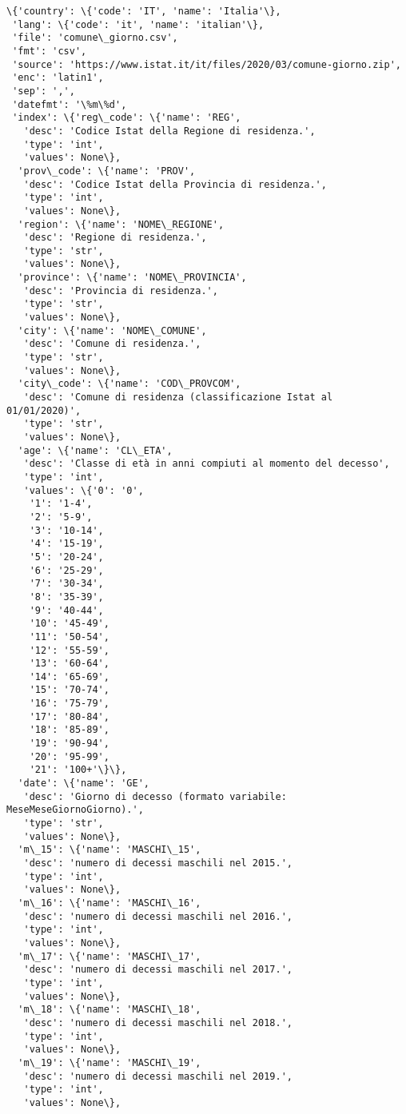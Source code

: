 \documentclass[11pt]{article}
\makeatletter
\newcommand{\boxspacing}{\kern\kvtcb@left@rule\kern\kvtcb@boxsep}
\newcommand{\prompt}[4]{
        \ttfamily\llap{{\color{#2}[#3]:\hspace{3pt}#4}}\vspace{-\baselineskip}
    }
\makeatother
\begin{document}
            \begin{tcolorbox}[breakable, size=fbox, boxrule=.5pt, pad at break*=1mm, opacityfill=0]
\prompt{Out}{outcolor}{9}{\boxspacing}
\begin{Verbatim}[commandchars=\\\{\}]
\{'country': \{'code': 'IT', 'name': 'Italia'\},
 'lang': \{'code': 'it', 'name': 'italian'\},
 'file': 'comune\_giorno.csv',
 'fmt': 'csv',
 'source': 'https://www.istat.it/it/files/2020/03/comune-giorno.zip',
 'enc': 'latin1',
 'sep': ',',
 'datefmt': '\%m\%d',
 'index': \{'reg\_code': \{'name': 'REG',
   'desc': 'Codice Istat della Regione di residenza.',
   'type': 'int',
   'values': None\},
  'prov\_code': \{'name': 'PROV',
   'desc': 'Codice Istat della Provincia di residenza.',
   'type': 'int',
   'values': None\},
  'region': \{'name': 'NOME\_REGIONE',
   'desc': 'Regione di residenza.',
   'type': 'str',
   'values': None\},
  'province': \{'name': 'NOME\_PROVINCIA',
   'desc': 'Provincia di residenza.',
   'type': 'str',
   'values': None\},
  'city': \{'name': 'NOME\_COMUNE',
   'desc': 'Comune di residenza.',
   'type': 'str',
   'values': None\},
  'city\_code': \{'name': 'COD\_PROVCOM',
   'desc': 'Comune di residenza (classificazione Istat al 01/01/2020)',
   'type': 'str',
   'values': None\},
  'age': \{'name': 'CL\_ETA',
   'desc': 'Classe di età in anni compiuti al momento del decesso',
   'type': 'int',
   'values': \{'0': '0',
    '1': '1-4',
    '2': '5-9',
    '3': '10-14',
    '4': '15-19',
    '5': '20-24',
    '6': '25-29',
    '7': '30-34',
    '8': '35-39',
    '9': '40-44',
    '10': '45-49',
    '11': '50-54',
    '12': '55-59',
    '13': '60-64',
    '14': '65-69',
    '15': '70-74',
    '16': '75-79',
    '17': '80-84',
    '18': '85-89',
    '19': '90-94',
    '20': '95-99',
    '21': '100+'\}\},
  'date': \{'name': 'GE',
   'desc': 'Giorno di decesso (formato variabile: MeseMeseGiornoGiorno).',
   'type': 'str',
   'values': None\},
  'm\_15': \{'name': 'MASCHI\_15',
   'desc': 'numero di decessi maschili nel 2015.',
   'type': 'int',
   'values': None\},
  'm\_16': \{'name': 'MASCHI\_16',
   'desc': 'numero di decessi maschili nel 2016.',
   'type': 'int',
   'values': None\},
  'm\_17': \{'name': 'MASCHI\_17',
   'desc': 'numero di decessi maschili nel 2017.',
   'type': 'int',
   'values': None\},
  'm\_18': \{'name': 'MASCHI\_18',
   'desc': 'numero di decessi maschili nel 2018.',
   'type': 'int',
   'values': None\},
  'm\_19': \{'name': 'MASCHI\_19',
   'desc': 'numero di decessi maschili nel 2019.',
   'type': 'int',
   'values': None\},

\end{Verbatim}
\end{tcolorbox}
\end{document}
